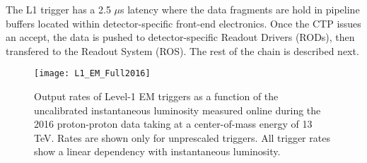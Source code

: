 The L1 trigger has a 2.5 $\mu$s latency where the data fragments are 
hold in pipeline buffers located within detector-specific front-end 
electronics. 
Once the CTP issues an accept, the data is pushed to detector-specific 
Readout Drivers (RODs), then transfered to the Readout System (ROS). 
The rest of the chain is described next. 

\begin{figure}[t!]
\centering
\texttt{[image: L1\_EM\_Full2016]}
\caption{Output rates of Level-1 EM triggers as a function of the uncalibrated instantaneous luminosity measured online during the 2016 proton-proton data taking at a center-of-mass energy of 13 TeV.
Rates are shown only for unprescaled triggers. All trigger rates show a linear dependency with instantaneous luminosity.}
\label{fig:}
\end{figure} 





